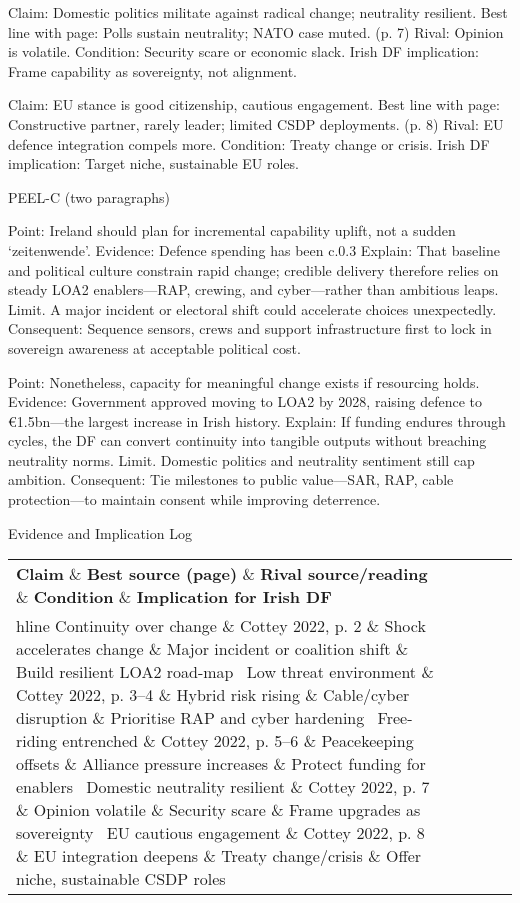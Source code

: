 Claim: Domestic politics militate against radical change; neutrality resilient. Best line with page: Polls sustain neutrality; NATO case muted. (p. 7) Rival: Opinion is volatile. Condition: Security scare or economic slack. Irish DF implication: Frame capability as sovereignty, not alignment.

Claim: EU stance is good citizenship, cautious engagement. Best line with page: Constructive partner, rarely leader; limited CSDP deployments. (p. 8) Rival: EU defence integration compels more. Condition: Treaty change or crisis. Irish DF implication: Target niche, sustainable EU roles.

PEEL-C (two paragraphs)

Point: Ireland should plan for incremental capability uplift, not a sudden ‘zeitenwende’.
Evidence: Defence spending has been c.0.3%
Explain: That baseline and political culture constrain rapid change; credible delivery therefore relies on steady LOA2 enablers—RAP, crewing, and cyber—rather than ambitious leaps.
Limit. A major incident or electoral shift could accelerate choices unexpectedly.
Consequent: Sequence sensors, crews and support infrastructure first to lock in sovereign awareness at acceptable political cost.

Point: Nonetheless, capacity for meaningful change exists if resourcing holds.
Evidence: Government approved moving to LOA2 by 2028, raising defence to €1.5bn—the largest increase in Irish history.
Explain: If funding endures through cycles, the DF can convert continuity into tangible outputs without breaching neutrality norms.
Limit. Domestic politics and neutrality sentiment still cap ambition.
Consequent: Tie milestones to public value—SAR, RAP, cable protection—to maintain consent while improving deterrence.

Evidence and Implication Log

\begin{tabular}{p{3.2cm}p{4.2cm}p{3.6cm}p{3.2cm}p{4.2cm}}
	\textbf{Claim} \& \textbf{Best source (page)} \& \textbf{Rival source/reading} \& \textbf{Condition} \& \textbf{Implication for Irish DF}\\hline
	Continuity over change \& Cottey 2022, p. 2 \& Shock accelerates change \& Major incident or coalition shift \& Build resilient LOA2 road-map \
	Low threat environment \& Cottey 2022, p. 3–4 \& Hybrid risk rising \& Cable/cyber disruption \& Prioritise RAP and cyber hardening \
	Free-riding entrenched \& Cottey 2022, p. 5–6 \& Peacekeeping offsets \& Alliance pressure increases \& Protect funding for enablers \
	Domestic neutrality resilient \& Cottey 2022, p. 7 \& Opinion volatile \& Security scare \& Frame upgrades as sovereignty \
	EU cautious engagement \& Cottey 2022, p. 8 \& EU integration deepens \& Treaty change/crisis \& Offer niche, sustainable CSDP roles \
\end{tabular}

